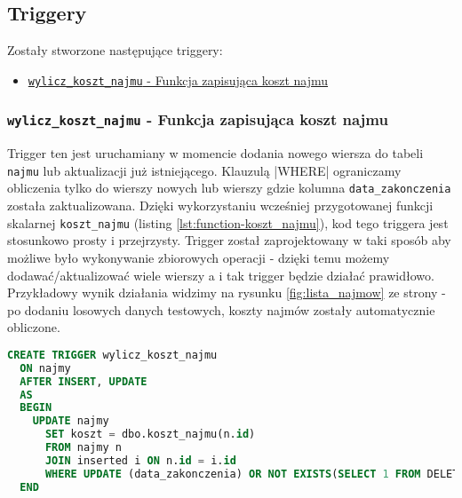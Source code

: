 \subsection{Triggery}

Zostały stworzone następujące triggery:
\begin{itemize}
	\item \href{run:Sources/SQL/5. Triggery/019_Utworzenie_triggeru_aktualizujacego_koszt_najmu.sql}{\texttt{wylicz\_koszt\_najmu} - Funkcja zapisująca koszt najmu}
\end{itemize}

\subsubsection{\texttt{wylicz\_koszt\_najmu} - Funkcja zapisująca koszt najmu}

Trigger ten jest uruchamiany w momencie dodania nowego wiersza do tabeli \texttt{najmu} lub aktualizacji już istniejącego. Klauzulą |WHERE| ograniczamy obliczenia tylko do wierszy nowych lub wierszy gdzie kolumna \texttt{data\_zakonczenia} została zaktualizowana. Dzięki wykorzystaniu wcześniej przygotowanej funkcji skalarnej \texttt{koszt\_najmu} (listing \ref{lst:function-koszt_najmu}), kod tego triggera jest stosunkowo prosty i przejrzysty. Trigger został zaprojektowany w taki sposób aby możliwe było wykonywanie zbiorowych operacji - dzięki temu możemy dodawać/aktualizować wiele wierszy a i tak trigger będzie działać prawidłowo. Przykładowy wynik działania widzimy na rysunku \ref{fig:lista_najmow} ze strony \pageref{fig:lista_najmow} - po dodaniu losowych danych testowych, koszty najmów zostały automatycznie obliczone.

\begin{lstlisting}[language=SQL, caption={Skrypt tworzący trigger \texttt{wylicz\_koszt\_najmu}}, label={lst:trigger-wylicz_koszt_najmu}]
CREATE TRIGGER wylicz_koszt_najmu
  ON najmy
  AFTER INSERT, UPDATE
  AS
  BEGIN
    UPDATE najmy
      SET koszt = dbo.koszt_najmu(n.id)
      FROM najmy n
      JOIN inserted i ON n.id = i.id
      WHERE UPDATE (data_zakonczenia) OR NOT EXISTS(SELECT 1 FROM DELETED)
  END
\end{lstlisting}